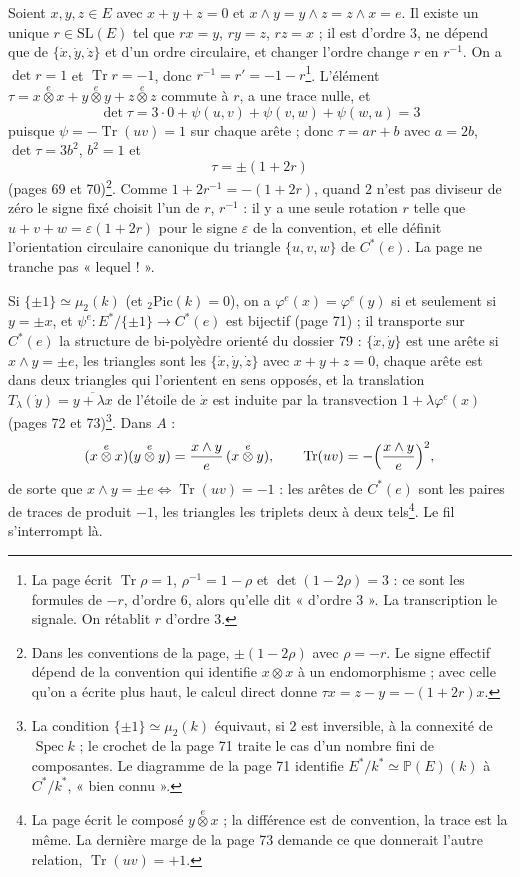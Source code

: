 \documentclass[11pt,a4paper]{article}
\begin{document}
Soient $x, y, z \in E$ avec $x + y + z = 0$ et $x \wedge y = y \wedge z = z \wedge
x = e$. Il existe un unique $r \in \mathrm{SL}(E)$ tel que $rx = y$, $ry = z$, $rz
= x$ ; il est d'ordre $3$, ne dépend que de $\{\dot x, \dot y, \dot z\}$ et d'un
ordre circulaire, et changer l'ordre change $r$ en $r^{-1}$. On a
$\det r = 1$ et $\operatorname{Tr}r = -1$, donc $r^{-1} = r' = -1 - r$\footnote{La
page écrit $\operatorname{Tr}\rho = 1$, $\rho^{-1} = 1 - \rho$ et $\det(1 -
2\rho) = 3$ : ce sont les formules de $-r$, d'ordre $6$, alors qu'elle dit
« d'ordre $3$ ». La transcription le signale. On rétablit $r$ d'ordre $3$.}.
L'élément $\tau = x \overset{e}{\otimes} x + y \overset{e}{\otimes} y + z
\overset{e}{\otimes} z$ commute à $r$, a une trace nulle, et
\[
  \det\tau = 3\cdot 0 + \psi(u, v) + \psi(v, w) + \psi(w, u) = 3
\]
puisque $\psi = -\operatorname{Tr}(uv) = 1$ sur chaque arête ; donc $\tau = a r
+ b$ avec $a = 2b$, $\det\tau = 3b^2$, $b^2 = 1$ et
\[
  \tau = \pm(1 + 2r)
\]
(pages 69 et 70)\footnote{Dans les conventions de la page, $\pm(1 - 2\rho)$
avec $\rho = -r$. Le signe effectif dépend de la convention qui identifie $x
\otimes x$ à un endomorphisme ; avec celle qu'on a écrite plus haut, le
calcul direct donne $\tau x = z - y = -(1 + 2r)x$.}. Comme $1 + 2r^{-1} = -(1 +
2r)$, quand $2$ n'est pas diviseur de zéro le signe fixé choisit l'un de $r$,
$r^{-1}$ : il y a une seule rotation $r$ telle que $u + v + w = \varepsilon(1 +
2r)$ pour le signe $\varepsilon$ de la convention, et elle définit l'orientation
circulaire canonique du triangle $\{u, v, w\}$ de $C^{*}(e)$. La page ne
tranche pas « lequel ! ».

Si $\{\pm 1\} \simeq \mu_2(k)$ (et ${}_2\mathrm{Pic}(k) = 0$), on a
$\varphi^{e}(x) = \varphi^{e}(y)$ si et seulement si $y = \pm x$, et
$\psi^{e} : E^{*}/\{\pm 1\} \to C^{*}(e)$ est bijectif (page 71) ; il
transporte sur $C^{*}(e)$ la structure de bi-polyèdre orienté du dossier 79 :
$\{\dot x, \dot y\}$ est une arête si $x \wedge y = \pm e$, les triangles sont
les $\{\dot x, \dot y, \dot z\}$ avec $x + y + z = 0$, chaque arête est dans
deux triangles qui l'orientent en sens opposés, et la translation $T_\lambda(\dot
y) = \overline{y + \lambda x}$ de l'étoile de $\dot x$ est induite par la
transvection $1 + \lambda\varphi^{e}(x)$ (pages 72 et 73)\footnote{La
condition $\{\pm 1\} \simeq \mu_2(k)$ équivaut, si $2$ est inversible, à la
connexité de $\operatorname{Spec}k$ ; le crochet de la page 71 traite le cas
d'un nombre fini de composantes. Le diagramme de la page 71 identifie
$E^{*}/k^{*} \simeq \mathbb{P}(E)(k)$ à $C^{*}/k^{*}$, « bien connu ».}. Dans
$A$ :
\[
  (x \overset{e}{\otimes} x)(y \overset{e}{\otimes} y) = \frac{x \wedge y}{e}\,(x
  \overset{e}{\otimes} y),\qquad
  \operatorname{Tr}(uv) = -\Bigl(\frac{x \wedge y}{e}\Bigr)^2,
\]
de sorte que $x \wedge y = \pm e \iff \operatorname{Tr}(uv) = -1$ : les arêtes de
$C^{*}(e)$ sont les paires de traces de produit $-1$, les triangles les
triplets deux à deux tels\footnote{La page écrit le composé $y
\overset{e}{\otimes} x$ ; la différence est de convention, la trace est la même.
La dernière marge de la page 73 demande ce que donnerait l'autre relation,
$\operatorname{Tr}(uv) = +1$.}. Le fil s'interrompt là.
\end{document}
